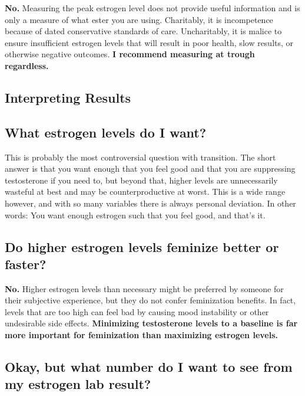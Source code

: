 \documentclass{article}
\begin{document}
\textbf{No.} Measuring the peak estrogen level does not provide useful information and is only a measure of what ester you are using. Charitably, it is incompetence because of dated conservative standards of care. Uncharitably, it is malice to ensure insufficient estrogen levels that will result in poor health, slow results, or otherwise negative outcomes. \textbf{I recommend measuring at trough regardless.}

\subsection*{Interpreting Results}

\subsection{What estrogen levels do I want?}

This is probably the most controversial question with transition. The short answer is that you want enough that you feel good and that you are suppressing testosterone if you need to, but beyond that, higher levels are unnecessarily wasteful at best and may be counterproductive at worst. This is a wide range however, and with so many variables there is always personal deviation. In other words: You want enough estrogen such that you feel good, and that’s it.

\subsection{Do higher estrogen levels feminize better or faster?}

\textbf{No.} Higher estrogen levels than necessary might be preferred by someone for their subjective experience, but they do not confer feminization benefits. In fact, levels that are too high can feel bad by causing mood instability or other undesirable side effects. \textbf{Minimizing testosterone levels to a baseline is far more important for feminization than maximizing estrogen levels.}

\subsection{Okay, but what number do I want to see from my estrogen lab result?}
\end{document}
